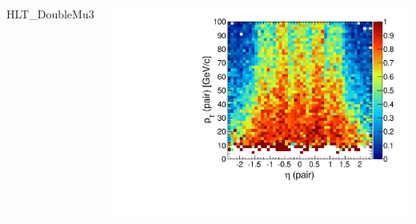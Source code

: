 \documentclass[compress]{beamer}
\begin{document}
\begin{frame}
\begin{columns}
\centering HLT\_DoubleMu3

\includegraphics[width=\linewidth]{pteta_mass10cut_DMu3.pdf}
\end{columns}
\end{frame}
\end{document}
